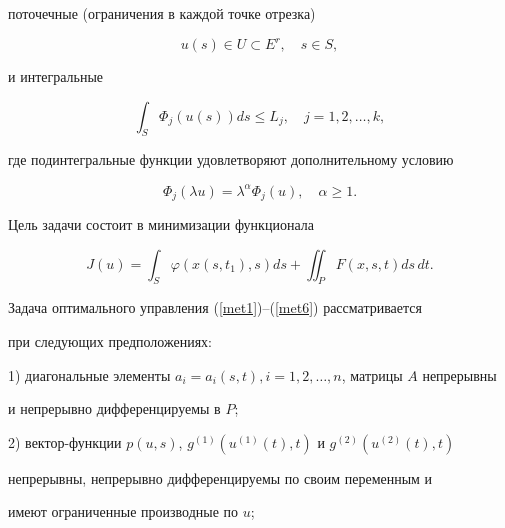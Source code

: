 поточечные (ограничения в каждой точке отрезка)


\begin{equation}


u(s)\in U\subset E^r, \quad s\in S,


\label{met4}


\end{equation}





и интегральные


\begin{equation}


\label{met5}


\int_S \Phi_j(u(s)) ds \leq L_j, \quad j=1,2,\dotsc,k,


\end{equation}


где подинтегральные функции удовлетворяют дополнительному условию


$$


\Phi_j(\lambda u)=\lambda^\alpha \Phi_j(u),\quad \alpha\geq 1.


$$


Цель задачи состоит в минимизации функционала


\begin{equation}


J(u)=\int_S \varphi(x(s,t_1),s)ds+\iint_P


F(x,s,t) ds\, dt.


\label{met6}


\end{equation}





Задача оптимального управления (\ref{met1})--(\ref{met6}) рассматривается 


при следующих предположениях:





1) диагональные элементы $a_i=a_i(s,t), i=1,2,\dotsc,n$, матрицы $A$ непрерывны


и непрерывно дифференцируемы в $P$;





2) вектор-функции $p(u,s)$, $g^{(1)}(u^{(1)}(t),t)$ и $g^{(2)}(u^{(2)}(t),t)$


непрерывны, непрерывно дифференцируемы по своим переменным и 


имеют ограниченные производные по $u$;





